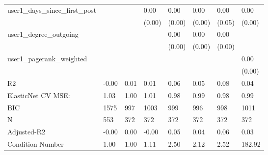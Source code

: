 \begin{table}
\begin{center}
\begin{tabular}{llllllll}
user1_days_since_first_post                    &          &            & 0.00    & 0.00    & 0.00     & 0.00               & 0.00     \\
                                               &          &            & (0.00)  & (0.00)  & (0.00)   & (0.05)             & (0.00)   \\
user1_degree_outgoing                          &          &            &         & 0.00    & 0.00     & 0.00               &          \\
                                               &          &            &         & (0.00)  & (0.00)   & (0.00)             &          \\
user1_pagerank_weighted                        &          &            &         &         &          &                    & 0.00     \\
                                               &          &            &         &         &          &                    & (0.00)   \\
R2                                             & -0.00    & 0.01       & 0.01    & 0.06    & 0.05     & 0.08               & 0.04     \\
ElasticNet CV MSE:                             & 1.03     & 1.00       & 1.01    & 0.98    & 0.99     & 0.98               & 0.99     \\
BIC                                            & 1575     & 997        & 1003    & 999     & 996      & 998                & 1011     \\
N                                              & 553      & 372        & 372     & 372     & 372      & 372                & 372      \\
Adjusted-R2                                    & -0.00    & 0.00       & -0.00   & 0.05    & 0.04     & 0.06               & 0.03     \\
Condition Number                               & 1.00     & 1.00       & 1.11    & 2.50    & 2.12     & 2.52               & 182.92   \\
\hline
\end{tabular}
\end{center}
\end{table}